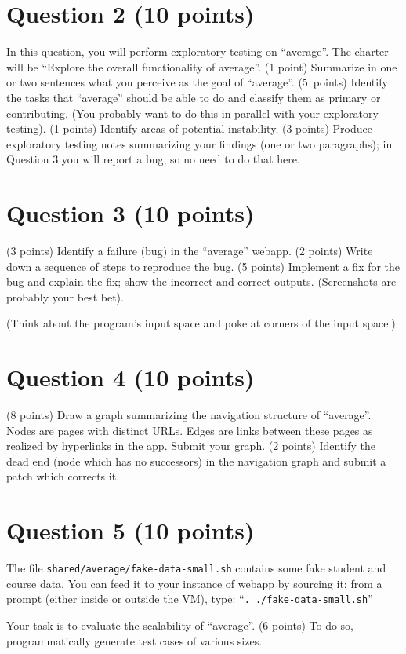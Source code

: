 \documentclass[10pt,hidelinks]{article}
\begin{document}
\section*{Question 2 (10 points)}
In this question, you will perform exploratory testing on ``average''.
The charter will be ``Explore the overall functionality of
average''. (1 point) Summarize in one or two sentences what you
perceive as the goal of ``average''. (5~points) Identify the tasks
that ``average'' should be able to do and classify them as primary or
contributing. (You probably want to do this in parallel with your
exploratory testing). (1 points) Identify areas of potential
instability. (3 points) Produce exploratory testing notes summarizing
your findings (one or two paragraphs); in Question 3 you will report a
bug, so no need to do that here.

\section*{Question 3 (10 points)}
(3 points) Identify a failure (bug) in the ``average'' webapp. (2 points) Write down a sequence of
steps to reproduce the bug. (5 points) Implement a fix for the bug and explain the
fix; show the incorrect and correct outputs. (Screenshots are probably
your best bet).

(Think about the program's input space and poke at corners of the
input space.)

\section*{Question 4 (10 points)}
(8 points) Draw a graph summarizing the navigation structure of ``average''.
Nodes are pages with distinct URLs. Edges are links between these
pages as realized by hyperlinks in the app. Submit your graph.
(2 points) Identify the dead end (node which has no successors) in the navigation
graph and submit a patch which corrects it.

\section*{Question 5 (10 points)}
The file {\tt shared/average/fake-data-small.sh}
contains some fake student and course
data. You can feed it to your instance of webapp by sourcing it: from a prompt 
(either inside or outside the VM),
type: ``\verb+. ./fake-data-small.sh+''

Your task is to evaluate the scalability of ``average''. (6 points) To do
so, programmatically generate test cases of various sizes. 
\end{document}
